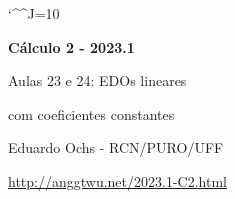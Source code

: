 \documentclass[oneside,12pt]{article}
\begin{document}

\def\drafturl{http://anggtwu.net/LATEX/2023-1-C2.pdf}
\def\drafturl{http://anggtwu.net/2023.1-C2.html}
\def\draftfooter{\tiny \href{\drafturl}{\jobname{}} \ColorBrown{\shorttoday{} \hours}}


\catcode`\^^J=10

\def\Caurl   #1{\expr{Caurl("#1")}}
\def\Cahref#1#2{\href{\Caurl{#1}}{#2}}
\def\Ca      #1{\Cahref{#1}{#1}}

\def\pictgridstyle{\color{GrayPale}\linethickness{0.3pt}}
\def\pictaxesstyle{\linethickness{0.5pt}}
\def\pictnaxesstyle{\color{GrayPale}\linethickness{0.5pt}}
\celllower=2.5pt

\pu



%

\thispagestyle{empty}

\begin{center}

\vspace*{1.2cm}

{\bf \Large Cálculo 2 - 2023.1}

\bsk

Aulas 23 e 24: EDOs lineares

com coeficientes constantes

\bsk

Eduardo Ochs - RCN/PURO/UFF

\url{http://anggtwu.net/2023.1-C2.html}

\end{center}
\end{document}
